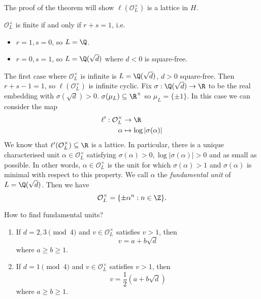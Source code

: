 \documentclass[a4paper]{article}
\renewcommand*{\O}{\mathcal{O}}
\begin{document}
The proof of the theorem will show \(\ell(\O_L^\times)\) is a lattice in \(H\).

\begin{eg}
  \(\O_L^\times\) is finite if and only if \(r + s = 1\), i.e.
  \begin{itemize}
  \item \(r = 1, s = 0\), so \(L = \Q\). 
  \item \(r = 0, s = 1\), so \(L = \Q(\sqrt d)\) where \(d < 0\) is square-free.
  \end{itemize}
  The first case where \(\O_L^\times\) is infinite is \(L = \Q(\sqrt d)\), \(d > 0\) square-free. Then \(r + s - 1 = 1\), so \(\ell(\O_L^\times)\) is infinite cyclic. Fix \(\sigma: \Q(\sqrt d) \to \R\) to be the real embedding with \(\sigma(\sqrt d) > 0\). \(\sigma(\mu_L) \subseteq \R^\times\) so \(\mu_L = \{\pm 1\}\). In this case we can consider the map
  \begin{align*}
    \ell': \O_L^\times &\to \R \\
    \alpha &\mapsto \log |\sigma(\alpha)|
  \end{align*}
  We know that \(\ell'(\O_L^\times) \subseteq \R\) is a lattice. In particular, there is a unique characterised unit \(\alpha \in \O_L^\times\) satisfying \(\sigma(\alpha) > 0, \log |\sigma(\alpha)| > 0\) and as small as possible. In other words, \(\alpha \in \O_L^\times\) is the unit for which \(\sigma(\alpha) > 1\) and \(\sigma(\alpha)\) is minimal with respect to this property. We call \(\alpha \) the \emph{fundamental unit} of \(L = \Q(\sqrt d)\). Then we have
  \[
    \O_L^\times = \{\pm \alpha^n: n \in \Z\}.
  \]
\end{eg}

How to find fundamental units?

\begin{lemma}\leavevmode
  \begin{enumerate}
  \item If \(d = 2, 3 \pmod 4\) and \(v \in \O_L^\times\) satisfies \(v > 1\), then
    \[
      v = a + b \sqrt d
    \]
    where \(a \geq b \geq 1\).
  \item If \(d = 1 \pmod 4\) and \(v \in \O_L^\times\) satisfies \(v > 1\), then
    \[
      v = \frac{1}{2}(a + b\sqrt d)
    \]
    where \(a \geq b \geq 1\).
  \end{enumerate}
\end{lemma}
\end{document}
